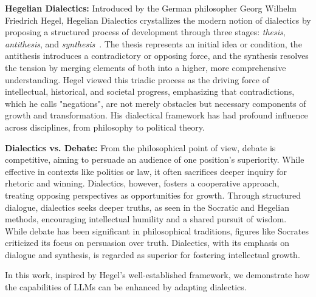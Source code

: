 \textbf{Hegelian Dialectics:} Introduced by the German philosopher Georg Wilhelm Friedrich Hegel, Hegelian Dialectics crystallizes the modern notion of dialectics by proposing a structured process of development through three stages: \textit{thesis}, \textit{antithesis}, and \textit{synthesis}~\cite{hegel_science_logic,hegel_phenomenology_spirit}. The thesis represents an initial idea or condition, the antithesis introduces a contradictory or opposing force, and the synthesis resolves the tension by merging elements of both into a higher, more comprehensive understanding. 
Hegel viewed this triadic process as the driving force of intellectual, historical, and societal progress, emphasizing that contradictions, which he calls "negations", are not merely obstacles but necessary components of growth and transformation. His dialectical framework has had profound influence across disciplines, from philosophy to political theory.

\textbf{Dialectics vs. Debate:} From the philosophical point of view, debate is competitive, aiming to persuade an audience of one position's superiority. While effective in contexts like politics or law, it often sacrifices deeper inquiry for rhetoric and winning. Dialectics, however, fosters a cooperative approach, treating opposing perspectives as opportunities for growth. Through structured dialogue, dialectics seeks deeper truths, as seen in the Socratic and Hegelian methods, encouraging intellectual humility and a shared pursuit of wisdom. While debate has been significant in philosophical traditions, figures like Socrates criticized its focus on persuasion over truth. Dialectics, with its emphasis on dialogue and synthesis, is regarded as superior for fostering intellectual growth.

In this work, inspired by Hegel's well-established framework, we demonstrate how the capabilities of LLMs can be enhanced by adapting dialectics.
